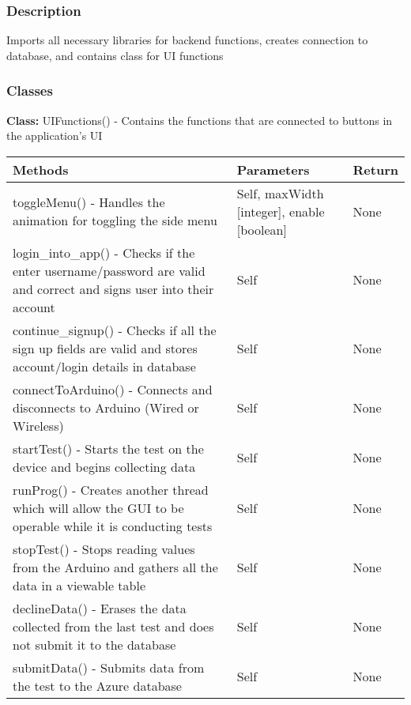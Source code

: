 \documentclass[12pt, titlepage]{article}
\begin{document}
    \subsubsection{Description}
    Imports all necessary libraries for backend functions, creates connection to database, and contains class for UI functions
    
    \subsubsection{Classes}
    \textbf{Class:} UIFunctions() - Contains the functions that are connected to buttons in the application’s UI \\
    
      \noindent \begin{tabular}{| p{} | p{}| p{}|}
        \hline
        \rowcolor[gray]{0.9}
        Methods & Parameters & Return\\
        \hline
        toggleMenu() - Handles the animation for toggling the side menu &Self, maxWidth [integer], enable [boolean] & None \\
        \hline
        login\_into\_app() - Checks if the enter username/password are valid and correct and signs user into their account & Self & None \\
        \hline
        continue\_signup() - Checks if all the sign up fields are valid and stores account/login details in database & Self & None \\
        \hline
        connectToArduino() - Connects and disconnects to Arduino (Wired or Wireless) & Self & None \\
        \hline
        startTest() - Starts the test on the device and begins collecting data & Self & None\\
        \hline
        runProg() - Creates another thread which will allow the GUI to be operable while it is conducting tests & Self & None\\
        \hline
        stopTest() - Stops reading values from the Arduino and gathers all the data in a viewable table & Self & None\\
        \hline
        declineData() - Erases the data collected from the last test and does not submit it to the database & Self & None\\
        \hline
        submitData() - Submits data from the test to the Azure database & Self & None\\
        \hline
      \end{tabular}
\end{document}
